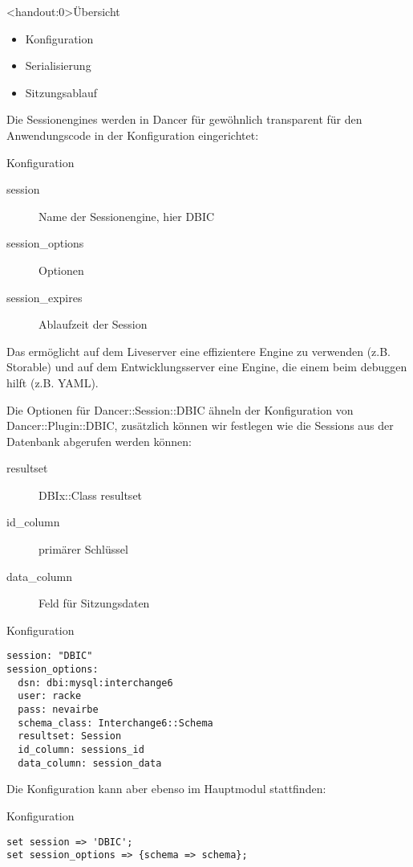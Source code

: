 \begin{frame}<handout:0>{Übersicht}
\begin{itemize}
\item Konfiguration
\item Serialisierung
\item Sitzungsablauf
\end{itemize}
\end{frame}

Die Sessionengines werden in Dancer für gewöhnlich transparent
für den Anwendungscode in der Konfiguration eingerichtet:

\begin{frame}{Konfiguration}
\begin{description}
\item[session] Name der Sessionengine, hier DBIC
\item[session\_options] Optionen
\item[session\_expires] Ablaufzeit der Session
\end{description}
\end{frame}

Das ermöglicht auf dem Liveserver eine effizientere Engine
zu verwenden (z.B. Storable) und auf dem Entwicklungsserver
eine Engine, die einem beim debuggen hilft (z.B. YAML).

Die Optionen für Dancer::Session::DBIC ähneln der Konfiguration von
Dancer::Plugin::DBIC, zusätzlich können wir festlegen wie
die Sessions aus der Datenbank abgerufen werden können:

\begin{description}
\item[resultset] DBIx::Class resultset
\item[id\_column] primärer Schlüssel
\item[data\_column] Feld für Sitzungsdaten 
\end{description}

\begin{frame}[fragile]{Konfiguration}
\begin{lstlisting}
session: "DBIC"
session_options:
  dsn: dbi:mysql:interchange6
  user: racke
  pass: nevairbe
  schema_class: Interchange6::Schema
  resultset: Session
  id_column: sessions_id
  data_column: session_data
\end{lstlisting}
\end{frame}

Die Konfiguration kann aber ebenso im Hauptmodul
stattfinden:

\begin{frame}[fragile]{Konfiguration}
\begin{lstlisting}
set session => 'DBIC';
set session_options => {schema => schema};
\end{lstlisting}
\end{frame}


